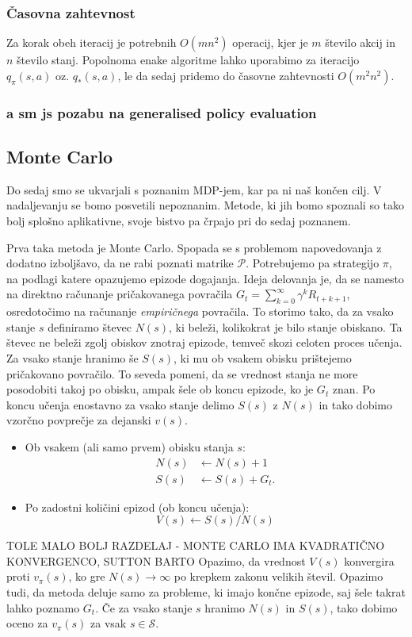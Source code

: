 \documentclass[12pt,a4paper]{amsart}
\theoremstyle{definition} %
\theoremstyle{plain} %
\begin{document}
\subsubsection{Časovna zahtevnost}
Za korak obeh iteracij je potrebnih $O(mn^2)$ operacij, kjer je $m$ število akcij in $n$ število 
stanj. Popolnoma enake algoritme lahko uporabimo za iteracijo $q_\pi(s, a)$ oz. $q_*(s, a)$, le 
da sedaj pridemo do časovne zahtevnosti $O(m^2n^2)$.

\subsubsection{a sm js pozabu na generalised policy evaluation}

\subsection{Monte Carlo}
Do sedaj smo se ukvarjali s poznanim MDP-jem, kar pa ni naš končen cilj. V nadaljevanju se bomo 
posvetili nepoznanim. Metode, ki jih bomo spoznali so tako bolj splošno aplikativne, svoje 
bistvo pa črpajo pri do sedaj poznanem.

Prva taka metoda je Monte Carlo. Spopada se s problemom napovedovanja z dodatno izboljšavo, da 
ne rabi poznati matrike $\mathcal{P}$. Potrebujemo pa strategijo $\pi$, na podlagi katere opazujemo 
epizode dogajanja. Ideja delovanja je, da se namesto na direktno računanje pričakovanega povračila
$G_t = \sum_{k=0}^\infty \gamma^k R_{t + k + 1}$, osredotočimo na računanje \textit{empiričnega} 
povračila. To storimo tako, da za vsako stanje $s$ definiramo števec $N(s)$, ki beleži, kolikokrat 
je bilo stanje obiskano. Ta števec ne beleži zgolj obiskov znotraj epizode, temveč skozi celoten 
proces učenja. Za vsako stanje hranimo še $S(s)$, ki mu ob vsakem obisku prištejemo pričakovano 
povračilo. To seveda pomeni, da se vrednost stanja ne more posodobiti takoj po obisku, ampak šele 
ob koncu epizode, ko je $G_t$ znan. Po koncu učenja enostavno za vsako stanje delimo $S(s)$ z $N(s)$
in tako dobimo vzorčno povprečje za dejanski $v(s)$.

\begin{itemize}
    \item Ob vsakem (ali samo prvem) obisku stanja $s$: 
        \begin{align*}
            N(s) &\leftarrow N(s) + 1 \\
            S(s) &\leftarrow S(s) + G_t.
        \end{align*}
    \item Po zadostni količini epizod (ob koncu učenja): 
        $$
        V(s) \leftarrow S(s) / N(s)
        $$
\end{itemize}
TOLE MALO BOLJ RAZDELAJ - MONTE CARLO IMA KVADRATIČNO KONVERGENCO, SUTTON BARTO
Opazimo, da vrednost $V(s)$ konvergira proti $v_\pi(s)$, ko gre $N(s) \rightarrow \infty$ po 
krepkem zakonu velikih števil. Opazimo tudi, da metoda deluje samo za probleme, ki imajo končne 
epizode, saj šele takrat lahko poznamo $G_t$. Če za vsako stanje $s$ hranimo $N(s)$ in $S(s)$, 
tako dobimo oceno za $v_\pi(s)$ za vsak $s \in \mathcal{S}$.
\end{document}
